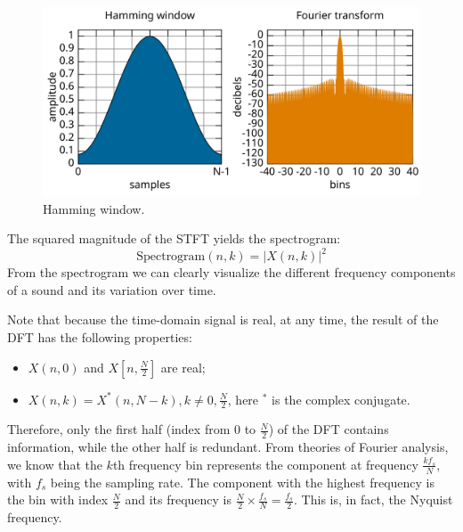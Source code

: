 \documentclass[12pt,final,twoside]{report}
\theoremstyle{plain}
\theoremstyle{definition}
\theoremstyle{remark}
\begin{document}
\begin{figure}[t]
  \centering
  \includegraphics[width=.6\textwidth]{hamming}
  \caption{Hamming window.}
  \label{fig:hamming}
\end{figure}

The squared magnitude of the STFT yields the spectrogram:
\[ \text{Spectrogram}(n, k) = \left|X(n,k)\right|^2 \]
From the spectrogram we can clearly visualize the different frequency components of a sound and its variation over time.

Note that because the time-domain signal is real, at any time, the result of the DFT has the following properties:
\begin{itemize}
  \item $X(n,0)$ and $X[n, \frac{N}{2}]$ are real;
  \item $X(n,k) = X^*(n,N-k), k \neq 0, \frac{N}{2}$, here $^*$ is the complex conjugate.
\end{itemize}

Therefore, only the first half (index from $0$ to $\frac{N}{2}$) of the DFT contains information, while the other half is redundant. From theories of Fourier analysis, we know that the $k$th frequency bin represents the component at frequency $\frac{kf_s}{N}$, with $f_s$ being the sampling rate. The component with the highest frequency is the bin with index $\frac{N}{2}$ and its frequency is $\frac{N}{2} \times \frac{f_s}{N} = \frac{f_s}{2}$. This is, in fact, the Nyquist frequency.
\end{document}

